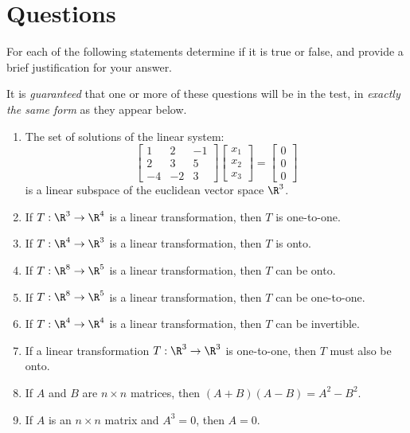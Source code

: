 \documentclass[12pt]{article}
\begin{document}
\section{Questions}
For each of the following statements determine if it is true or false, and provide a brief justification for your answer.

It is \emph{guaranteed} that one or more of these questions will be in the test, in \emph{exactly the same form} as they appear below.


\begin{enumerate}

\item The set of solutions of the linear system:
\[
\begin{bmatrix}1&2&-1\\2&3&5\\-4&-2&3\end{bmatrix}
\begin{bmatrix}x_1\\x_2\\x_3\end{bmatrix}=
\begin{bmatrix}0\\0\\0\end{bmatrix}
\]
is a linear subspace of the euclidean vector space $\R^3$.

\item If $T:\R^3\to\R^4$ is a linear transformation, then $T$ is one-to-one.

\item If $T:\R^4\to\R^3$ is a linear transformation, then $T$ is onto.

\item If $T:\R^8\to\R^5$ is a linear transformation, then $T$ can be onto.

\item If $T:\R^8\to\R^5$ is a linear transformation, then $T$ can be one-to-one.

\item If $T:\R^4\to\R^4$ is a linear transformation, then $T$ can be invertible.

\item If a linear transformation $T:\R^3\to\R^3$ is one-to-one, then $T$ must also be onto.

\item If $A$ and $B$ are $n\times n$ matrices, then $(A+B)(A-B)=A^2-B^2$.

\item If $A$ is an $n\times n$ matrix and $A^3=0$, then $A=0$.


\end{enumerate}
\end{document}
